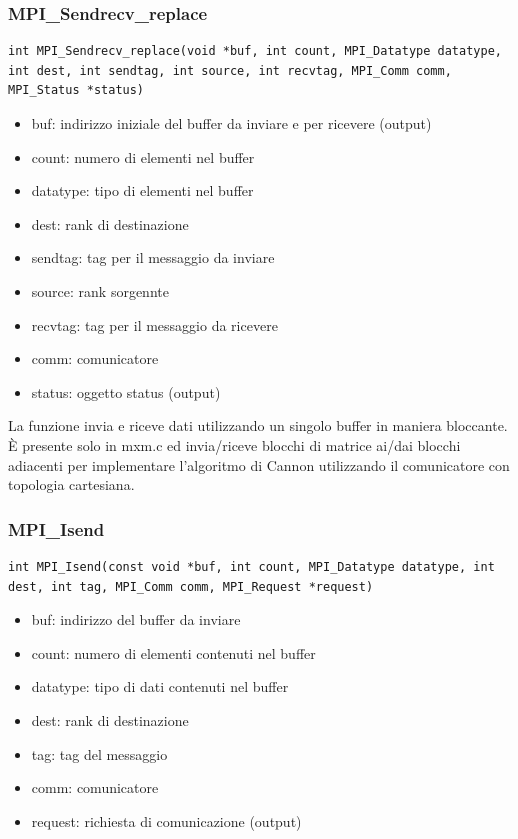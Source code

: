 \subsubsection{MPI\_Sendrecv\_replace}
\begin{lstlisting}
int MPI_Sendrecv_replace(void *buf, int count, MPI_Datatype datatype, int dest, int sendtag, int source, int recvtag, MPI_Comm comm, MPI_Status *status)
\end{lstlisting}
\begin{itemize}
  \item buf: indirizzo iniziale del buffer da inviare e per ricevere (output)
  \item count: numero di elementi nel buffer
  \item datatype: tipo di elementi nel buffer
  \item dest: rank di destinazione
  \item sendtag: tag per il messaggio da inviare
  \item source: rank sorgennte
  \item recvtag: tag per il messaggio da ricevere
  \item comm: comunicatore
  \item status: oggetto status (output)
\end{itemize}

La funzione invia e riceve dati utilizzando un singolo buffer in maniera bloccante. \`{E} presente solo in mxm.c ed invia/riceve blocchi di matrice ai/dai blocchi adiacenti per implementare l'algoritmo di Cannon utilizzando il comunicatore con topologia cartesiana.

\subsubsection{MPI\_Isend}
\begin{lstlisting}
int MPI_Isend(const void *buf, int count, MPI_Datatype datatype, int dest, int tag, MPI_Comm comm, MPI_Request *request)
\end{lstlisting}
\begin{itemize}
  \item buf: indirizzo del buffer da inviare
  \item count: numero di elementi contenuti nel buffer
  \item datatype: tipo di dati contenuti nel buffer
  \item dest: rank di destinazione
  \item tag: tag del messaggio
  \item comm: comunicatore
  \item request: richiesta di comunicazione (output)
\end{itemize}


